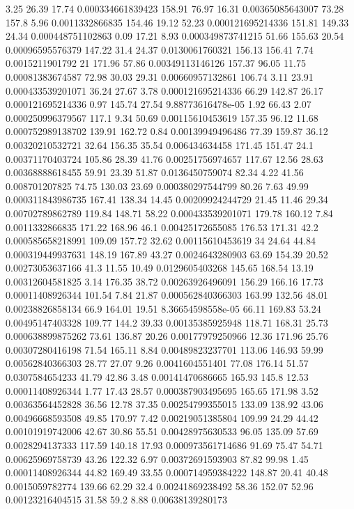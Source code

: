 3.25 26.39 17.74 0.000334661839423
158.91 76.97 16.31 0.00365085643007
73.28 157.8 5.96 0.0011332866835
154.46 19.12 52.23 0.000121695214336
151.81 149.33 24.34 0.000448751102863
0.09 17.21 8.93 0.000349873741215
51.66 155.63 20.54 0.00096595576379
147.22 31.4 24.37 0.0130061760321
156.13 156.41 7.74 0.0015211901792
21 171.96 57.86 0.00349113146126
157.37 96.05 11.75 0.00081383674587
72.98 30.03 29.31 0.00660957132861
106.74 3.11 23.91 0.000433539201071
36.24 27.67 3.78 0.000121695214336
66.29 142.87 26.17 0.000121695214336
0.97 145.74 27.54 9.88773616478e-05
1.92 66.43 2.07 0.000250996379567
117.1 9.34 50.69 0.00115610453619
157.35 96.12 11.68 0.000752989138702
139.91 162.72 0.84 0.00139949496486
77.39 159.87 36.12 0.00320210532721
32.64 156.35 35.54 0.006434634458
171.45 151.47 24.1 0.00371170403724
105.86 28.39 41.76 0.00251756974657
117.67 12.56 28.63 0.00368888618455
59.91 23.39 51.87 0.0136450759074
82.34 4.22 41.56 0.008701207825
74.75 130.03 23.69 0.000380297544799
80.26 7.63 49.99 0.000311843986735
167.41 138.34 14.45 0.00209924244729
21.45 11.46 29.34 0.00702789862789
119.84 148.71 58.22 0.000433539201071
179.78 160.12 7.84 0.0011332866835
171.22 168.96 46.1 0.00425172655085
176.53 171.31 42.2 0.000585658218991
109.09 157.72 32.62 0.00115610453619
34 24.64 44.84 0.000319449937631
148.19 167.89 43.27 0.0024643280903
63.69 154.39 20.52 0.00273053637166
41.3 11.55 10.49 0.0129605403268
145.65 168.54 13.19 0.00312604581825
3.14 176.35 38.72 0.00263926496091
156.29 166.16 17.73 0.00011408926344
101.54 7.84 21.87 0.000562840366303
163.99 132.56 48.01 0.00238826858134
66.9 164.01 19.51 8.36654598558e-05
66.11 169.83 53.24 0.00495147403328
109.77 144.2 39.33 0.00135385925948
118.71 168.31 25.73 0.000638899875262
73.61 136.87 20.26 0.00177979250966
12.36 171.96 25.76 0.00307280416198
71.54 165.11 8.84 0.00489823237701
113.06 146.93 59.99 0.00562840366303
28.77 27.07 9.26 0.0041604551401
77.08 176.14 51.57 0.0307584654233
41.79 42.86 3.48 0.00141470686665
165.93 145.8 12.53 0.00011408926344
1.77 17.43 28.57 0.000387903495695
165.65 171.98 3.52 0.00363564452828
36.56 12.78 37.35 0.00254799355015
133.09 138.92 43.06 0.00496668593508
49.85 170.97 7.42 0.00219051385804
109.99 24.29 44.42 0.00101919742006
42.67 30.86 55.51 0.00428975630533
96.05 135.09 57.69 0.0028294137333
117.59 140.18 17.93 0.000973561714686
91.69 75.47 54.71 0.00625969758739
43.26 122.32 6.97 0.00372691593903
87.82 99.98 1.45 0.00011408926344
44.82 169.49 33.55 0.000714959384222
148.87 20.41 40.48 0.0015059782774
139.66 62.29 32.4 0.00241869238492
58.36 152.07 52.96 0.00123216404515
31.58 59.2 8.88 0.00638139280173
